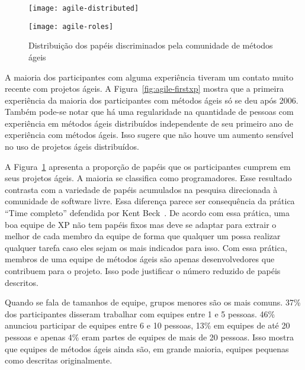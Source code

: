 \begin{figure}[thb]
  \begin{minipage}[t]{0.6\linewidth}
    \centering
    \texttt{[image: agile-distributed]}
    \caption{Ano da 1$^{\textrm{a}}$ experiência com métodos ágeis com
      experiência distribuída ou não}
    \label{fig:agile-firstxp}
  \end{minipage}
  \begin{minipage}[t]{0.4\linewidth}
    \centering
    \texttt{[image: agile-roles]}
    \caption{Distribuição dos papéis discriminados pela comunidade de
      métodos ágeis}
    \label{fig:agile-roles}
  \end{minipage}
\end{figure}

A maioria dos participantes com alguma experiência tiveram um contato
muito recente com projetos ágeis. A Figura~\ref{fig:agile-firstxp}
mostra que a primeira experiência da maioria dos participantes com
métodos ágeis só se deu após 2006. Também pode-se notar que há uma
regularidade na quantidade de pessoas com experiência em métodos ágeis
distribuídos independente de seu primeiro ano de experiência com
métodos ágeis. Isso sugere que não houve um aumento sensível no uso de
projetos ágeis distribuídos.

A Figura~\ref{fig:agile-roles} apresenta a proporção de papéis que os
participantes cumprem em seus projetos ágeis. A maioria se classifica
como programadores. Esse resultado contrasta com a variedade de papéis
acumulados na pesquisa direcionada à comunidade de software
livre. Essa diferença parece ser consequência da prática ``Time
completo'' defendida por Kent Beck~\cite{XP01}. De acordo com essa
prática, uma boa equipe de XP não tem papéis fixos mas deve se adaptar
para extrair o melhor de cada membro da equipe de forma que qualquer
um possa realizar qualquer tarefa caso eles sejam os mais indicados
para isso. Com essa prática, membros de uma equipe de métodos ágeis
são apenas desenvolvedores que contribuem para o projeto. Isso pode
justificar o número reduzido de papéis descritos.


Quando se fala de tamanhos de equipe, grupos menores são os mais
comuns. 37\% dos participantes disseram trabalhar com equipes entre 1
e 5 pessoas. 46\% anunciou participar de equipes entre 6 e 10 pessoas,
13\% em equipes de até 20 pessoas e apenas 4\% eram partes de equipes
de mais de 20 pessoas. Isso mostra que equipes de métodos ágeis ainda
são, em grande maioria, equipes pequenas como descritas originalmente.

